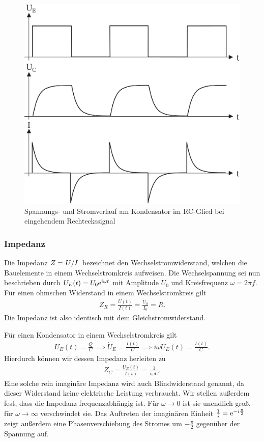 \begin{figure}[H]
  \centering
  \includegraphics[width=.65\textwidth]{files/script/spannung_rc_rechteck.png}
  \caption{Spannungs- und Stromverlauf am Kondensator im RC-Glied bei eingehendem Rechteckssignal}
  \label{fig:spannung_rc_rechteck}
\end{figure}

\subsubsection*{Impedanz}
Die Impedanz $Z = \ffrac{U}{I}$ bezeichnet den Wechselstromwiderstand, welchen die Bauelemente in einem Wechselstromkreis aufweisen. Die Wechselspannung sei nun beschrieben durch $U_E(t) = U_0\text{e}^{i \omega t}$ mit Amplitude $U_0$ und Kreisfrequenz $\omega = 2\pi f$. Für einen ohmschen Widerstand in einem Wechselstromkreis gilt
\begin{align}
  Z_R = \frac{U(t)}{I(t)} = \frac{U_0}{I_0} = R.
\end{align}
Die Impedanz ist also identisch mit dem Gleichstromwiderstand. 

Für einen Kondensator in einem Wechselstromkreis gilt
\begin{align}
  U_E(t) = \frac{Q}{C} \implies \dot{U}_E = \frac{I(t)}{C} \implies i \omega U_E(t) = \frac{I(t)}{C}.
\end{align}
Hierdurch können wir dessen Impedanz herleiten zu
\begin{align}
  Z_C = \frac{U_E(t)}{I(t)} = \frac{1}{i \omega C}.
\end{align}
Eine solche rein imaginäre Impedanz wird auch Blindwiderstand genannt, da dieser Widerstand keine elektrische Leistung verbraucht. Wir stellen außerdem fest, dass die Impedanz frequenzabhängig ist. Für $\omega \to 0$ ist sie unendlich groß, für $\omega \to \infty$ verschwindet sie. Das Auftreten der imaginären Einheit $\frac{1}{i} = \text{e}^{-i \frac{\pi}{2}}$ zeigt außerdem eine Phasenverschiebung des Stromes um $-\frac{\pi}{2}$ gegenüber der Spannung auf.

